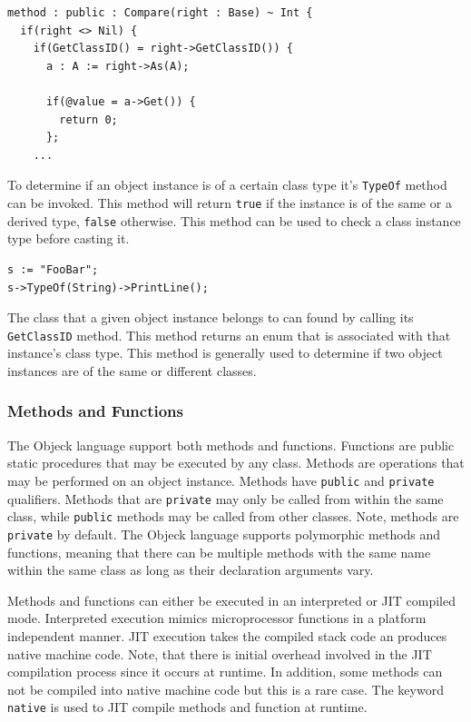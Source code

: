 \documentclass[12pt]{article}
\begin{document}
\begin{verbatim}
method : public : Compare(right : Base) ~ Int {
  if(right <> Nil) {
    if(GetClassID() = right->GetClassID()) {
      a : A := right->As(A);

      if(@value = a->Get()) {
        return 0;
      };
    ...	
\end{verbatim}

To determine if an object instance is of a certain class type it's
\texttt{TypeOf} method can be invoked.  This method will return
\texttt{true} if the instance is of the same or a derived type,
\texttt{false} otherwise.  This method can be used to check a class
instance type before casting it.

\begin{verbatim}
s := "FooBar";
s->TypeOf(String)->PrintLine();
\end{verbatim}

The class that a given object instance belongs to can found by calling
its \texttt{GetClassID} method.  This method returns an enum that is
associated with that instance's class type.  This method is generally
used to determine if two object instances are of the same or different
classes.

\subsubsection{Methods and Functions}
The Objeck language support both methods and functions.  Functions are
public static procedures that may be executed by any class.  Methods
are operations that may be performed on an object instance.  Methods
have \texttt{public} and \texttt{private} qualifiers.  Methods that
are \texttt{private} may only be called from within the same class,
while \texttt{public} methods may be called from other classes.  Note,
methods are \texttt{private} by default. The Objeck language supports
polymorphic methods and functions, meaning that there can be multiple
methods with the same name within the same class as long as their
declaration arguments vary.

Methods and functions can either be executed in an interpreted or JIT
compiled mode. Interpreted execution mimics microprocessor functions
in a platform independent manner. JIT execution takes the compiled
stack code an produces native machine code. Note, that there is
initial overhead involved in the JIT compilation process since it
occurs at runtime. In addition, some methods can not be compiled into
native machine code but this is a rare case.  The keyword
\texttt{native} is used to JIT compile methods and function at
runtime.
\end{document}
